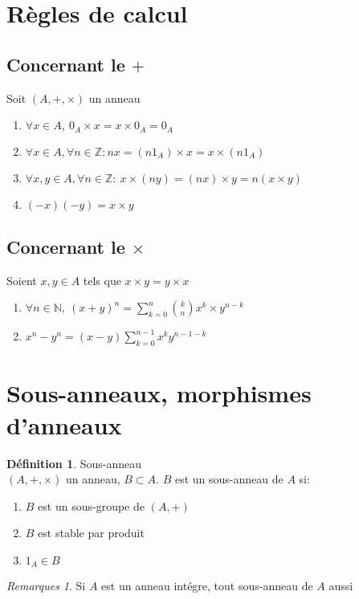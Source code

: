 \documentclass[fleqn]{article}
\theoremstyle{definition} \newtheorem*{defi}{D\'efinition}
\theoremstyle{definition} \newtheorem*{theo}{Th\'eor\`eme}
\theoremstyle{definition} \newtheorem*{coro}{Corollaire}
\theoremstyle{definition} \newtheorem*{nota}{Notation}
\theoremstyle{remark} \newtheorem*{rqs}{Remarques}
\theoremstyle{definition} \newtheorem*{prop}{Propri\'et\'e}
\begin{document}
\section{R\`egles de calcul}
\subsection{Concernant le $+$}
Soit $(A, +, \times)$ un anneau
\begin{enumerate}
	\item $\forall x \in A,\ 0_A \times x = x \times 0_A = 0_A$
	\item $\forall x \in A, \forall n \in \mathbb{Z}: nx = (n1_A) \times x = x \times (n1_A)$
	\item $\forall x,y \in A, \forall n \in \mathbb{Z}:\ x \times (ny) = (nx) \times y = n(x \times y)$
	\item $(-x)(-y) = x \times y$
\end{enumerate}

\subsection{Concernant le $\times$}
Soient $x, y \in A$ tels que $x \times y = y \times x$
\begin{enumerate}
	\item $\forall n \in \mathbb{N},\ (x + y)^n = \sum_{k=0}^n \binom{k}{n}x^k \times y^{n-k}$
	\item $x^n - y^n = (x-y)\sum_{k=0}^{n-1}x^ky^{n-1-k}$
\end{enumerate}

\section{Sous-anneaux, morphismes d'anneaux}
\begin{defi} Sous-anneau \\
	$(A,+,\times)$ un anneau, $B \subset A$. $B$ est un sous-anneau de $A$ si:
	\begin{enumerate}
		\item $B$ est un sous-groupe de $(A,+)$
		\item $B$ est stable par produit
		\item $1_A \in B$
	\end{enumerate}

	\begin{rqs}
		Si $A$ est un anneau int\'egre, tout sous-anneau de $A$ aussi
	\end{rqs}
\end{defi}
\end{document}
